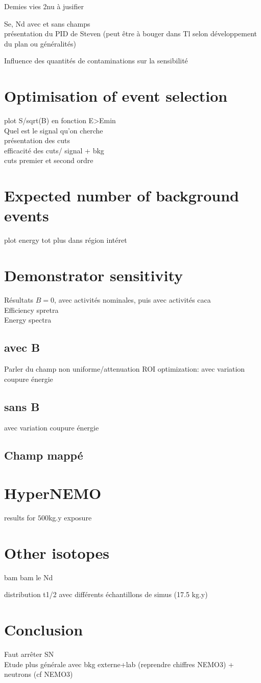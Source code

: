 Demies vies 2nu à jusifier


Se, Nd avec et sans champs\\
présentation du PID de Steven (peut être à bouger dans Tl selon développement du plan ou généralités)

Influence des quantités de contaminations sur la sensibilité

\section{Optimisation of event selection}
plot S/sqrt(B) en fonction E>Emin\\


Quel est le signal qu'on cherche\\
présentation des cuts\\
efficacité des cuts/ signal + bkg\\
cuts premier et second ordre
\section{Expected number of background events}
plot energy tot
plus dans région intéret


\section{Demonstrator sensitivity}
Résultats $B=0$, avec activités nominales, puis avec activités caca\\
Efficiency spretra\\
Energy spectra

\subsection{avec B}
Parler du champ non uniforme/attenuation
ROI optimization: avec variation coupure énergie\\

\subsection{sans B}
avec variation coupure énergie\\

\subsection{Champ mappé}


\section{HyperNEMO}
results for $500$kg.y exposure

\section{Other isotopes}
bam bam le Nd

distribution t1/2 avec différents échantillons de simus (17.5 kg.y)

\section{Conclusion}
Faut arrêter SN\\
Etude plus générale avec bkg externe+lab (reprendre chiffres NEMO3)
+ neutrons (cf NEMO3)
